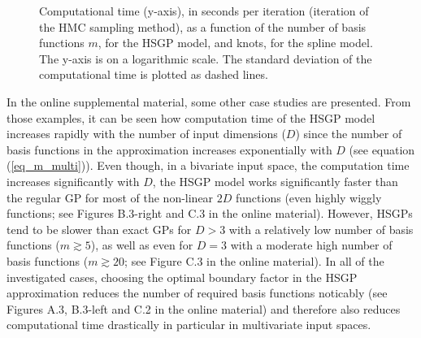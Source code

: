 \documentclass[onecolumn,a4paper,11pt]{article}
\begin{document}
\begin{figure}
\centering
{}
\caption{Computational time (y-axis), in seconds per iteration (iteration of the HMC sampling method), as a function of the number of basis functions $m$, for the HSGP model, and knots, for the spline model. The y-axis is on a logarithmic scale. The standard deviation of the computational time is plotted as dashed lines.}
  \label{ch5_fig11_time_exI}
\end{figure}

In the online supplemental material, some other case studies are presented. From those examples, it can be seen how computation time of the HSGP model increases rapidly with the number of input dimensions ($D$) since the number of basis functions in the approximation increases exponentially with $D$ (see equation (\ref{eq_m_multi})). Even though, in a bivariate input space, the computation time increases significantly with $D$, the HSGP model works significantly faster than the regular GP for most of the non-linear $2D$ functions (even highly wiggly functions; see Figures B.3-right and C.3 in the online material). However, HSGPs tend to be slower than exact GPs for $D>3$ with a relatively low number of basis functions ($m \gtrsim 5$), as well as even for $D=3$ with a moderate high number of basis functions ($m \gtrsim 20$; see Figure C.3 in the online material). In all of the investigated cases, choosing the optimal boundary factor in the HSGP approximation reduces the number of required basis functions noticably (see Figures A.3, B.3-left and C.2 in the online material) and therefore also reduces computational time drastically in particular in multivariate input spaces.
\end{document}
